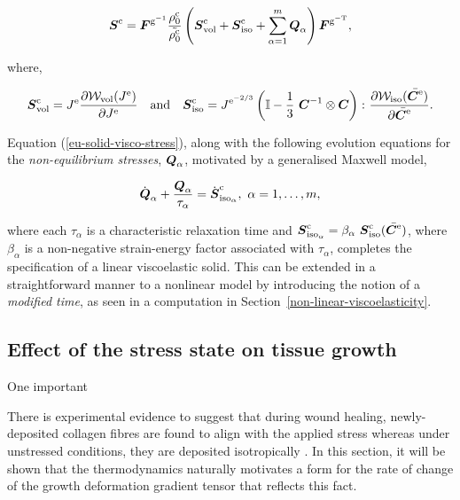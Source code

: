 \begin{equation}
\mbox{\boldmath$ S$}^{\mathrm{c}} = \mbox{\boldmath$ F$}^{\mathrm{g}^{\mathrm{-1}}}
\frac{\rho_{0}^{\mathrm{c}}}{\tilde{\rho_{0}^{\mathrm{c}}}}\left(
\mbox{\boldmath$ S$}^{\mathrm{c}}_{\mathrm{vol}}+\mbox{\boldmath$ S$}^{\mathrm{c}}_{\mathrm{iso}}+
\sum_{\alpha=1}^{m}\mbox{\boldmath$ Q$}_{\alpha} \right)
\mbox{\boldmath$ F$}^{\mathrm{g}^{\mathrm{-T}}},
\label{eu-solid-visco-stress}
\end{equation}

\noindent where,

\begin{equation*}
\mbox{\boldmath$ S$}^{\mathrm{c}}_{\mathrm{vol}} = J^{\mathrm{e}} \frac{\partial
  {\mathcal W}_{\mathrm{vol}}(J^{\mathrm{e}})}{\partial J^{\mathrm{e}}} \quad
\mathrm{and} \quad \mbox{\boldmath$ S$}^{\mathrm{c}}_{\mathrm{iso}} =
J^{\mathrm{e}^{-2/3}} \left(\mathbb{I} - \frac{1}{3}\ \mbox{\boldmath$ C$}^{-1} \otimes
\mbox{\boldmath$ C$} \right) \colon
\frac{\partial{\mathcal W}_{\mathrm{iso}}(\bar{\mbox{\boldmath$ C$}^{\mathrm{e}}})}{\partial
  \bar{\mbox{\boldmath$ C$}^{\mathrm{e}}}}.
\end{equation*}

\noindent Equation (\ref{eu-solid-visco-stress}), along with the
following evolution equations for the {\em non-equilibrium stresses},
$\mbox{\boldmath$ Q$}_{\alpha}$, motivated by a generalised Maxwell model,

\begin{equation}
\dot{\mbox{\boldmath$ Q$}}_{\alpha}+\frac{\mbox{\boldmath$ Q$}_{\alpha}}{\tau_{\alpha}} =
\dot{\mbox{\boldmath$ S$}}^{\mathrm{c}}_{\mathrm{iso}_{\alpha}},\ \alpha=1,\ldots,m,
\label{eu-linearviscoelasticity}
\end{equation}

\noindent where each $\tau_{\alpha}$ is a characteristic relaxation
time and $\mbox{\boldmath$ S$}^{\mathrm{c}}_{\mathrm{iso}_{\alpha}} =
\beta_{\alpha}\ \mbox{\boldmath$ S$}^{\mathrm{c}}_{\mathrm{iso}}
(\bar{\mbox{\boldmath$ C$}^{\mathrm{e}}})$, where $\beta_{\alpha}$ is a non-negative
strain-energy factor associated with $\tau_{\alpha}$, completes the
specification of a linear viscoelastic solid. This can be extended in
a straightforward manner to a nonlinear model by introducing the
notion of a {\em modified time}, as seen in a computation in
Section~\ref{non-linear-viscoelasticity}.

\subsection{Effect of the stress state on tissue growth}
\label{eu-stress-dependent-growth}

One important 

There is experimental evidence to suggest that during wound healing,
newly-de\-po\-sit\-ed collagen fibres are found to align with the
applied stress whereas under unstressed conditions, they are deposited
isotropically \citep{Provenzanoetal:2003}. In this section, it will be
shown that the thermodynamics naturally motivates a form for the
rate of change of the growth deformation gradient tensor that reflects
this fact. 


